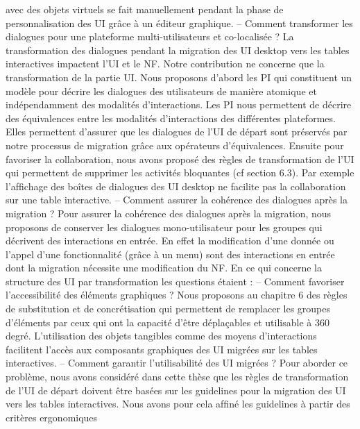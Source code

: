 \documentclass{article}
\begin{document}
avec des objets virtuels se fait manuellement pendant la phase de personnalisation des UI gr\^{a}ce
\`{a} un \'{e}diteur graphique.
– Comment transformer les dialogues pour une plateforme multi-utilisateurs et co-localis\'{e}e ?
La transformation des dialogues pendant la migration des UI desktop vers les tables interactives impactent l’UI et le NF. Notre contribution ne concerne que la transformation de la partie
UI. Nous proposons d’abord les PI qui constituent un mod\`{e}le pour d\'{e}crire les dialogues des
utilisateurs de mani\`{e}re atomique et ind\'{e}pendamment des modalit\'{e}s d’interactions. Les PI nous
permettent de d\'{e}crire des \'{e}quivalences entre les modalit\'{e}s d’interactions des diff\'{e}rentes plateformes. Elles permettent d’assurer que les dialogues de l’UI de d\'{e}part sont pr\'{e}serv\'{e}s par notre
processus de migration gr\^{a}ce aux op\'{e}rateurs d’\'{e}quivalences.
Ensuite pour favoriser la collaboration, nous avons propos\'{e} des r\`{e}gles de transformation de l’UI
qui permettent de supprimer les activit\'{e}s bloquantes (cf section 6.3). Par exemple l’afﬁchage
des bo\^{i}tes de dialogues des UI desktop ne facilite pas la collaboration sur une table interactive.
– Comment assurer la coh\'{e}rence des dialogues apr\`{e}s la migration ?
Pour assurer la coh\'{e}rence des dialogues apr\`{e}s la migration, nous proposons de conserver les
dialogues mono-utilisateur pour les groupes qui d\'{e}crivent des interactions en entr\'{e}e. En effet la
modiﬁcation d’une donn\'{e}e ou l’appel d’une fonctionnalit\'{e} (gr\^{a}ce \`{a} un menu) sont des interactions en entr\'{e}e dont la migration n\'{e}cessite une modiﬁcation du NF.
En ce qui concerne la structure des UI par transformation les questions \'{e}taient :
– Comment favoriser l’accessibilit\'{e} des \'{e}l\'{e}ments graphiques ?
Nous proposons au chapitre 6 des r\`{e}gles de substitution et de concr\'{e}tisation qui permettent de
remplacer les groupes d’\'{e}l\'{e}ments par ceux qui ont la capacit\'{e} d’\^{e}tre d\'{e}pla\c{c}ables et utilisable \`{a}
360 degr\'{e}. L’utilisation des objets tangibles comme des moyens d’interactions facilitent l’acc\`{e}s
aux composants graphiques des UI migr\'{e}es sur les tables interactives.
– Comment garantir l’utilisabilit\'{e} des UI migr\'{e}es ?
Pour aborder ce probl\`{e}me, nous avons consid\'{e}r\'{e} dans cette th\`{e}se que les r\`{e}gles de transformation de l’UI de d\'{e}part doivent \^{e}tre bas\'{e}es sur les guidelines pour la migration des UI vers les
tables interactives. Nous avons pour cela afﬁn\'{e} les guidelines \`{a} partir des crit\`{e}res ergonomiques
\end{document}
